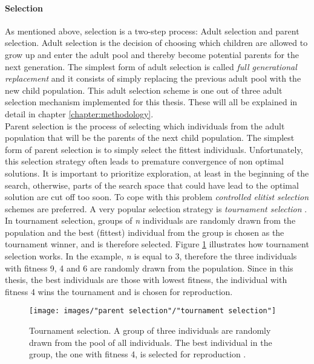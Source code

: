 \paragraph*{Selection}
As mentioned above, selection is a two-step process: Adult selection and parent selection. Adult selection is the decision of choosing which children are allowed to grow up and enter the adult pool and thereby become potential parents for the next generation. The simplest form of adult selection is called \textit{full generational replacement} and it consists of simply replacing the previous adult pool with the new child population. This adult selection scheme is one out of three adult selection mechanism implemented for this thesis. These will all be explained in detail in chapter \ref{chapter:methodology}.\\

\noindent Parent selection is the process of selecting which individuals from the adult population that will be the parents of the next child population. The simplest form of parent selection is to simply select the fittest individuals. Unfortunately, this selection strategy often leads to premature convergence of non optimal solutions. It is important to prioritize exploration, at least in the beginning of the search, otherwise, parts of the search space that could have lead to the optimal solution are cut off too soon. To cope with this problem \textit{controlled elitist selection} schemes are preferred. A very popular selection strategy is \textit{tournament selection} \citep{Razali}. In tournament selection, groups of \textit{n} individuals are randomly drawn from the population and the best (fittest) individual from the group is chosen as the tournament winner, and is therefore selected. Figure \ref{Tournament selection} illustrates how tournament selection works. In the example, \textit{n} is equal to 3, therefore the three individuals with fitness 9, 4 and 6 are randomly drawn from the population. Since in this thesis, the best individuals are those with lowest fitness, the individual with fitness 4 wins the tournament and is chosen for reproduction.\\


\begin{figure}[h!]
\begin{center}
\texttt{[image: images/"parent selection"/"tournament selection"]}
\caption{Tournament selection. A group of three individuals are randomly drawn from the pool of all individuals. The best individual  in the group, the one with fitness 4, is selected for reproduction \citep{Razali}.}
\label{Tournament selection}
\end{center}
\end{figure}


